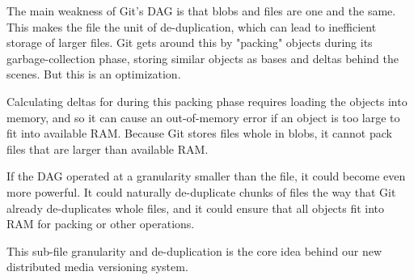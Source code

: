 The main weakness of Git's DAG is that blobs and files are one and the same.
This makes the file the unit of de-duplication, which can lead to inefficient
storage of larger files. Git gets around this by "packing" objects during its
garbage-collection phase, storing similar objects as bases and deltas behind the
scenes. But this is an optimization.

Calculating deltas for during this packing phase requires loading the objects
into memory, and so it can cause an out-of-memory error if an object is too
large to fit into available RAM. Because Git stores files whole in blobs, it
cannot pack files that are larger than available RAM.

If the DAG operated at a granularity smaller than the file, it could become even
more powerful. It could naturally de-duplicate chunks of files the way that Git
already de-duplicates whole files, and it could ensure that all objects fit into
RAM for packing or other operations.

This sub-file granularity and de-duplication is the core idea behind our new
distributed media versioning system.
